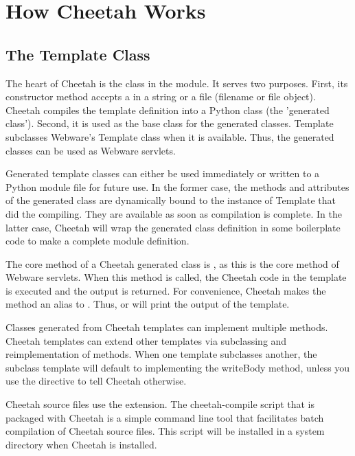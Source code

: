 \section{How Cheetah Works}
\label{howWorks}

\subsection{The Template Class}
\label{howWorks.templateClass}

The heart of Cheetah is the  class in the 
module. It serves two purposes. First, its constructor method accepts a
 in a string or a file (filename or file object).
Cheetah compiles the template definition into a Python class (the 'generated
class'). Second, it is used as the base class for the generated classes.
Template subclasses Webware's Template class when it is available. Thus, the
generated classes can be used as Webware servlets.

Generated template classes can either be used immediately or written to a Python
module file for future use. In the former case, the methods and attributes of
the generated class are dynamically bound to the instance of Template that did
the compiling. They are available as soon as compilation is complete. In the
latter case, Cheetah will wrap the generated class definition in some
boilerplate code to make a complete module definition.

The core method of a Cheetah generated class is , as this is the
core method of Webware servlets. When this method is called, the Cheetah code in
the template is executed and the output is returned. For convenience, Cheetah
makes the  method an alias to . Thus,
 or  will
print the output of the template.

Classes generated from Cheetah templates can implement multiple methods. Cheetah
templates can extend other templates via subclassing and reimplementation of
methods. When one template subclasses another, the subclass template will
default to implementing the writeBody method, unless you use the
 directive to tell Cheetah otherwise.

Cheetah source files use the  extension. The cheetah-compile script
that is packaged with Cheetah is a simple command line tool that facilitates
batch compilation of Cheetah source files. This script will be installed in a
system directory when Cheetah is installed.

